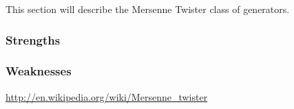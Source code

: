 This section will describe the Mersenne Twister class of generators.

\subsubsection{Strengths}
\subsubsection{Weaknesses}

\url{http://en.wikipedia.org/wiki/Mersenne_twister}
